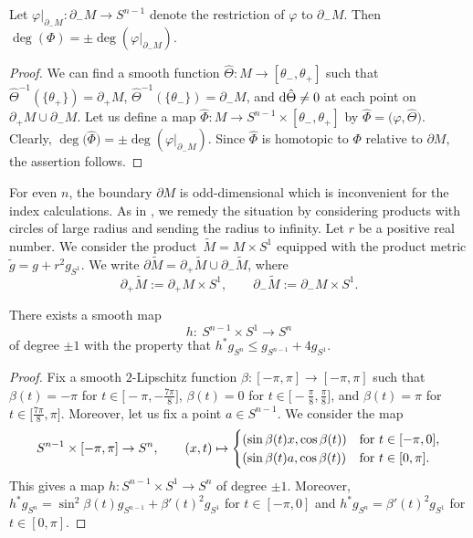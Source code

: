 \begin{Lemma} \label{deg_of_restriction}
Let $\varphi|_{\partial_- M}\colon \partial_- M \to S^{n-1}$ denote the restriction of $\varphi$ to $\partial_- M$.
Then $\deg(\Phi) = \pm \deg(\varphi|_{\partial_- M})$.
\end{Lemma}

\begin{proof}
We can find a smooth function $\hat{\Theta}\colon M \to [\theta_-,\theta_+]$ such that $\hat{\Theta}^{-1}(\{\theta_+\}) = \partial_+ M$, $\hat{\Theta}^{-1}(\{\theta_-\}) = \partial_- M$, and ${\rm d}\hat{\Theta} \neq 0$ at each point on $\partial_+ M \cup \partial_- M$.
Let us define a map $\hat{\Phi}\colon M \to S^{n-1} \times [\theta_-,\theta_+]$ by $\hat{\Phi} = \big(\varphi,\hat{\Theta}\big)$. Clearly, $\deg\big(\hat{\Phi}\big) = \pm \deg(\varphi|_{\partial_- M})$.
Since $\hat{\Phi}$ is homotopic to $\Phi$ relative to $\partial M$, the assertion follows.
\end{proof}

For even $n$, the boundary $\partial M$ is odd-dimensional which is inconvenient for the index calculations.
As in \cite{Llarull}, we remedy the situation by considering products with circles of large radius and sending the radius to infinity.
Let $r$ be a positive real number. We consider the product~${\tilde{M} = M \times S^1}$ equipped with the product metric $\tilde{g} = g + r^2 g_{S^1}$. We write $\partial \tilde{M} = \partial_+ \tilde{M} \cup \partial_- \tilde{M}$, where
\[\partial_+ \tilde{M} := \partial_+ M \times S^1, \qquad \partial_- \tilde{M} := \partial_- M \times S^1.\]

\begin{Lemma} \label{map_to_Sn}
There exists a smooth map
\begin{equation*}
 h\colon\ S^{n-1} \times S^1 \to S^n
\end{equation*}
of degree $\pm 1$ with the property that $h^* g_{S^n} \leq g_{S^{n-1}} + 4 g_{S^1}$.
\end{Lemma}

\begin{proof}
Fix a smooth $2$-Lipschitz function $\beta\colon [-\pi,\pi] \to [-\pi,\pi]$ such that $\beta(t) = -\pi$ for $t \in \bigl[-\pi,-\frac{7\pi}{8}\bigr]$, $\beta(t) = 0$ for $t \in \bigl[-\frac{\pi}{8},\frac{\pi}{8}\bigr]$, and $\beta(t) = \pi$ for $t \in \big[\frac{7\pi}{8},\pi\big]$. Moreover, let us fix a point $a \in S^{n-1}$. We consider the map
\[
 S^{n-1} \times [-\pi,\pi] \to S^n,\qquad (x,t) \mapsto \begin{cases} (\sin \beta(t) x,\cos \beta(t)) & \text{\rm for $t \in [-\pi,0]$}, \\
 (\sin \beta(t) a,\cos \beta(t)) & \text{\rm for $t \in [0,\pi]$.} \end{cases}
 \]
This gives a map $h\colon S^{n-1} \times S^1 \to S^n$ of degree $\pm 1$. Moreover, $h^* g_{S^n} = \sin^2 \beta(t) g_{S^{n-1}} + \beta'(t)^2 g_{S^1}$ for $t \in [-\pi,0]$ and $h^* g_{S^n} = \beta'(t)^2 g_{S^1}$ for $t \in [0,\pi]$.
\end{proof}

